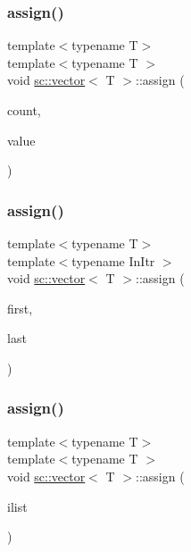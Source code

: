 \subsubsection{\texorpdfstring{assign()}{assign()}\hspace{0.1cm}{\footnotesize\ttfamily [5/7]}}
{\footnotesize\ttfamily template$<$typename T$>$ \\
template$<$typename T $>$ \\
void \mbox{\hyperlink{classsc_1_1vector}{sc\+::vector}}$<$ T $>$\+::assign (\begin{DoxyParamCaption}\item[{typename \mbox{\hyperlink{classsc_1_1vector}{vector}}$<$ T $>$\+::size\+\_\+type}]{count,  }\item[{const T \&}]{value }\end{DoxyParamCaption})}

\mbox{\label{classsc_1_1vector_ab3e7f37e35c8a5206d069676540a2573}} 
\subsubsection{\texorpdfstring{assign()}{assign()}\hspace{0.1cm}{\footnotesize\ttfamily [6/7]}}
{\footnotesize\ttfamily template$<$typename T$>$ \\
template$<$typename In\+Itr $>$ \\
void \mbox{\hyperlink{classsc_1_1vector}{sc\+::vector}}$<$ T $>$\+::assign (\begin{DoxyParamCaption}\item[{In\+Itr}]{first,  }\item[{In\+Itr}]{last }\end{DoxyParamCaption})}

\mbox{\label{classsc_1_1vector_a78760d9e3e005ed179947d12e2381103}} 
\subsubsection{\texorpdfstring{assign()}{assign()}\hspace{0.1cm}{\footnotesize\ttfamily [7/7]}}
{\footnotesize\ttfamily template$<$typename T$>$ \\
template$<$typename T $>$ \\
void \mbox{\hyperlink{classsc_1_1vector}{sc\+::vector}}$<$ T $>$\+::assign (\begin{DoxyParamCaption}\item[{std\+::initializer\+\_\+list$<$ T $>$}]{ilist }\end{DoxyParamCaption})}

